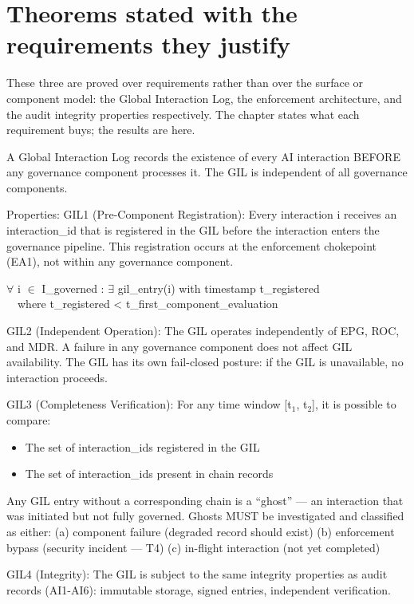 \section{Theorems stated with the requirements they justify}


These three are proved over requirements rather than over the surface or
component model: the Global Interaction Log, the enforcement architecture, and
the audit integrity properties respectively. The chapter states what each
requirement buys; the results are here.

\begin{creq}
A Global Interaction Log records the existence of every AI interaction BEFORE any governance component processes it. The GIL is independent of all governance components.

Properties: GIL1 (Pre-Component Registration): Every interaction i receives an interaction\_\allowbreak{}id that is registered in the GIL before the interaction enters the governance pipeline. This registration occurs at the enforcement chokepoint (EA1), not within any governance component.

\begin{claddisp}
$\forall$ i $\in$ I\_governed : $\exists$ gil\_entry(i) with timestamp t\_registered\\
~~where t\_registered < t\_first\_component\_evaluation\\
\end{claddisp}
GIL2 (Independent Operation): The GIL operates independently of EPG, ROC, and MDR. A failure in any governance component does not affect GIL availability. The GIL has its own fail-closed posture: if the GIL is unavailable, no interaction proceeds.

GIL3 (Completeness Verification): For any time window [t$_1$, t$_2$], it is possible to compare:
\begin{itemize}
  \item The set of interaction\_\allowbreak{}ids registered in the GIL
  \item The set of interaction\_\allowbreak{}ids present in chain records
\end{itemize}
Any GIL entry without a corresponding chain is a ``ghost'' --- an interaction that was initiated but not fully governed.
Ghosts MUST be investigated and classified as either: (a) component failure (degraded record should exist) (b) enforcement bypass (security incident --- T4) (c) in-flight interaction (not yet completed)

GIL4 (Integrity): The GIL is subject to the same integrity properties as audit records (AI1-AI6): immutable storage, signed entries, independent verification.

\end{creq}

